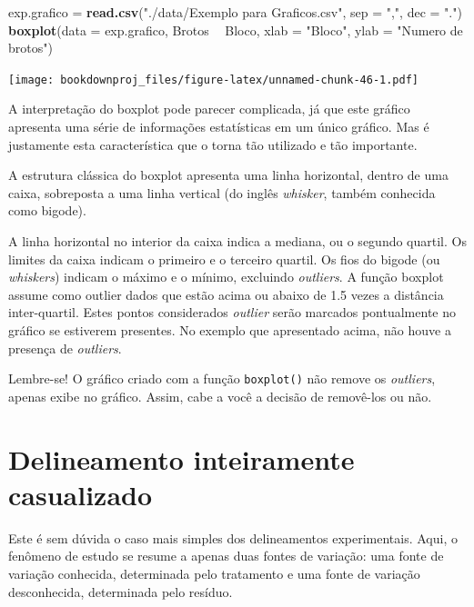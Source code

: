 \documentclass[
]{article}
\newenvironment{Shaded}{\begin{snugshade}}{\end{snugshade}}
\newcommand{\DataTypeTok}[1]{\textcolor[rgb]{0.13,0.29,0.53}{#1}}
\newcommand{\KeywordTok}[1]{\textcolor[rgb]{0.13,0.29,0.53}{\textbf{#1}}}
\newcommand{\NormalTok}[1]{#1}
\newcommand{\OperatorTok}[1]{\textcolor[rgb]{0.81,0.36,0.00}{\textbf{#1}}}
\newcommand{\StringTok}[1]{\textcolor[rgb]{0.31,0.60,0.02}{#1}}
\begin{document}
\begin{Shaded}
\begin{Highlighting}[]
\NormalTok{exp.grafico =}\StringTok{ }\KeywordTok{read.csv}\NormalTok{(}\StringTok{"./data/Exemplo para Graficos.csv"}\NormalTok{, }\DataTypeTok{sep =} \StringTok{","}\NormalTok{, }\DataTypeTok{dec =} \StringTok{"."}\NormalTok{)}
\KeywordTok{boxplot}\NormalTok{(}\DataTypeTok{data =}\NormalTok{ exp.grafico, Brotos }\OperatorTok{~}\StringTok{ }\NormalTok{Bloco, }
        \DataTypeTok{xlab =} \StringTok{"Bloco"}\NormalTok{, }
        \DataTypeTok{ylab =} \StringTok{"Numero de brotos"}\NormalTok{)}
\end{Highlighting}
\end{Shaded}

\texttt{[image: bookdownproj\_files/figure-latex/unnamed-chunk-46-1.pdf]}

A interpretação do boxplot pode parecer complicada, já que este gráfico apresenta uma série de informações estatísticas em um único gráfico. Mas é justamente esta característica que o torna tão utilizado e tão importante.

A estrutura clássica do boxplot apresenta uma linha horizontal, dentro de uma caixa, sobreposta a uma linha vertical (do inglês \emph{whisker}, também conhecida como bigode).

A linha horizontal no interior da caixa indica a mediana, ou o segundo quartil. Os limites da caixa indicam o primeiro e o terceiro quartil. Os fios do bigode (ou \emph{whiskers}) indicam o máximo e o mínimo, excluindo \emph{outliers}. A função boxplot assume como outlier dados que estão acima ou abaixo de 1.5 vezes a distância inter-quartil. Estes pontos considerados \emph{outlier} serão marcados pontualmente no gráfico se estiverem presentes. No exemplo que apresentado acima, não houve a presença de \emph{outliers}.

Lembre-se! O gráfico criado com a função \texttt{boxplot()} não remove os \emph{outliers}, apenas exibe no gráfico. Assim, cabe a você a decisão de removê-los ou não.

\hypertarget{delineamento-inteiramente-casualizado}{%
\section{Delineamento inteiramente casualizado}\label{delineamento-inteiramente-casualizado}}

Este é sem dúvida o caso mais simples dos delineamentos experimentais. Aqui, o fenômeno de estudo se resume a apenas duas fontes de variação: uma fonte de variação conhecida, determinada pelo tratamento e uma fonte de variação desconhecida, determinada pelo resíduo.
\end{document}
